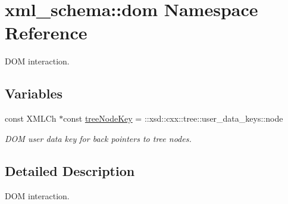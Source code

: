 \hypertarget{namespacexml__schema_1_1dom}{
\section{xml\_\-schema::dom Namespace Reference}
\label{namespacexml__schema_1_1dom}
}


DOM interaction.  


\subsection*{Variables}
\begin{DoxyCompactItemize}
\item 
\hypertarget{namespacexml__schema_1_1dom_aea364981e614f964cd9a9fae80e6a7bd}{
const XMLCh $\ast$const \hyperlink{namespacexml__schema_1_1dom_aea364981e614f964cd9a9fae80e6a7bd}{treeNodeKey} = ::xsd::cxx::tree::user\_\-data\_\-keys::node}
\label{namespacexml__schema_1_1dom_aea364981e614f964cd9a9fae80e6a7bd}

\begin{DoxyCompactList}\small\item\em DOM user data key for back pointers to tree nodes. \item\end{DoxyCompactList}\end{DoxyCompactItemize}


\subsection{Detailed Description}
DOM interaction. 